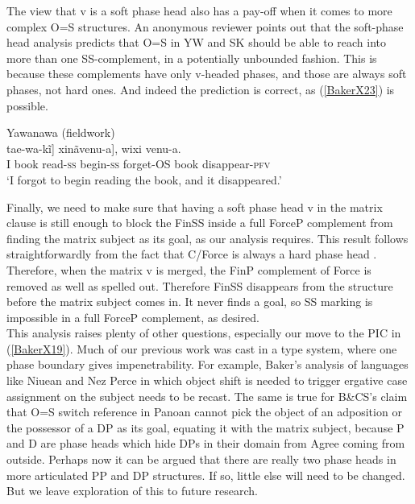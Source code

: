 \documentclass[output=paper,colorlinks,citecolor=brown,
]{langscibook}
\renewcommand{\sc}[1]{\textsc{#1}}
\begin{document}
The view that v is a soft phase head also has a pay-off when it comes to more complex O=S structures. An anonymous reviewer points out that the soft-phase head analysis predicts that O=S in YW and SK should be able to reach into more than one SS-complement, in a potentially unbounded fashion. This is because these complements have only v-headed phases, and those are always soft phases, not hard ones. And indeed the prediction is correct, as (\ref{BakerX23}) is possible.

\begin{exe}
    \ex Yawanawa (fieldwork) \label{BakerX23}\\
			\gll [Ẽ [[wixi ane-kĩ] tae-wa-kĩ] xinãvenu-a], wixi venu-a.\\
			    I book read-\sc{ss} begin-\sc{ss} forget-\sc{OS} book disappear-\sc{pfv}\\
			\glt `I forgot to begin reading the book, and it disappeared.'
\end{exe}

Finally, we need to make sure that having a soft phase head v in the matrix clause is still enough to block the FinSS inside a full ForceP complement from finding the matrix subject as its goal, as our analysis requires. This result follows straightforwardly from the fact that C/Force is always a hard phase head \citep[149]{baker2015case}. Therefore, when the matrix v is merged, the FinP complement of Force is removed as well as spelled out. Therefore FinSS disappears from the structure before the matrix subject comes in. It never finds a goal, so SS marking is impossible in a full ForceP complement, as desired.\\

This analysis raises plenty of other questions, especially our move to the PIC in (\ref{BakerX19}). Much of our previous work was cast in a \citet{chomsky2000minimalist} type system, where one phase boundary gives impenetrability. For example, Baker’s \citeyearpar{chomsky2000minimalist} analysis of languages like Niuean and Nez Perce in which object shift is needed to trigger ergative case assignment on the subject needs to be recast. The same is true for B\&CS’s claim that O=S switch reference in Panoan cannot pick the object of an adposition or the possessor of a DP as its goal, equating it with the matrix subject, because P and D are phase heads which hide DPs in their domain from Agree coming from outside. Perhaps now it can be argued that there are really two phase heads in more articulated PP and DP structures. If so, little else will need to be changed. But we leave exploration of this to future research.\\
\end{document}

